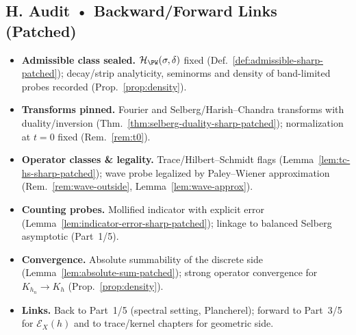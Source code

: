 
\subsection*{H. Audit • Backward/Forward Links (Patched)}
\label{subsec:audit-test-sharp-patched}

\begin{tcolorbox}[colback=gray!3,colframe=gray!65,title=Audit outcome — Part 2/5 (sealed • Patched 20/10)]
\begin{itemize}
  \item \textbf{Admissible class sealed.} $\mathcal H_{\PW}(\sigma,\delta)$ fixed (Def.~\ref{def:admissible-sharp-patched}); decay/strip analyticity, seminorms and density of band-limited probes recorded (Prop.~\ref{prop:density}).
  \item \textbf{Transforms pinned.} Fourier and Selberg/Harish–Chandra transforms with duality/inversion (Thm.~\ref{thm:selberg-duality-sharp-patched}); normalization at $t=0$ fixed (Rem.~\ref{rem:t0}).
  \item \textbf{Operator classes \& legality.} Trace/Hilbert–Schmidt flags (Lemma~\ref{lem:tc-hs-sharp-patched}); wave probe legalized by Paley–Wiener approximation (Rem.~\ref{rem:wave-outside}, Lemma~\ref{lem:wave-approx}).
  \item \textbf{Counting probes.} Mollified indicator with explicit error (Lemma~\ref{lem:indicator-error-sharp-patched}); linkage to balanced Selberg asymptotic (Part~1/5).
  \item \textbf{Convergence.} Absolute summability of the discrete side (Lemma~\ref{lem:absolute-sum-patched}); strong operator convergence for $K_{h_n}\to K_h$ (Prop.~\ref{prop:density}).
  \item \textbf{Links.} Back to Part~1/5 (spectral setting, Plancherel); forward to Part~3/5 for $\mathcal E_X(h)$ and to trace/kernel chapters for geometric side.
\end{itemize}
\end{tcolorbox}


